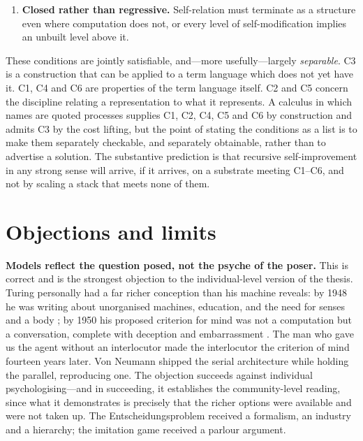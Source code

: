 \documentclass[11pt,a4paper]{article}
\begin{document}
\begin{enumerate}[label=\textbf{C\arabic*.},leftmargin=2.6em,itemsep=0.25em]
be constituted within the model rather than left as an unanalysed primitive to be
filled in during implementation. A model whose ontology must be relaxed in order
to be realised does not determine what its agents perceive with; the implementer
does. And an agent cannot construct, modify or reason about an organ made of
material the calculus does not describe. The general form of this condition is
ontological homogeneity (\S\ref{sec:vn}): computation is isolated enough that a
model may be built from one sort, and every second sort a model admits is a place
where something must be supplied from outside it.
\item \textbf{Closed rather than regressive.} Self-relation must terminate as a
structure even where computation does not, or every level of self-modification
implies an unbuilt level above it.
\end{enumerate}

These conditions are jointly satisfiable, and---more usefully---largely
\emph{separable}. C3 is a construction that can be applied to a term language
which does not yet have it. C1, C4 and C6 are properties of the term language
itself. C2 and C5 concern the discipline relating a representation to what it
represents. A calculus in which names are quoted processes supplies C1, C2, C4,
C5 and C6 by construction and admits C3 by the cost lifting, but the point of
stating the conditions as a list is to make them separately checkable, and
separately obtainable, rather than to advertise a solution. The substantive
prediction is that recursive self-improvement in any strong sense will arrive, if
it arrives, on a substrate meeting C1--C6, and not by scaling a stack that meets
none of them.

\section{Objections and limits}
\label{sec:objections}

\textbf{Models reflect the question posed, not the psyche of the poser.} This is
correct and is the strongest objection to the individual-level version of the
thesis. Turing personally had a far richer conception than his machine reveals: by
1948 he was writing about unorganised machines, education, and the need for senses
and a body \cite{turing1948}; by 1950 his proposed criterion for mind was not a
computation but a conversation, complete with deception and embarrassment
\cite{turing1950}. The man who gave us the agent without an interlocutor made the
interlocutor the criterion of mind fourteen years later. Von Neumann shipped the
serial architecture while holding the parallel, reproducing one. The objection
succeeds against individual psychologising---and in succeeding, it establishes the
community-level reading, since what it demonstrates is precisely that the richer
options were available and were not taken up. The Entscheidungsproblem received a
formalism, an industry and a hierarchy; the imitation game received a parlour
argument.
\end{document}
